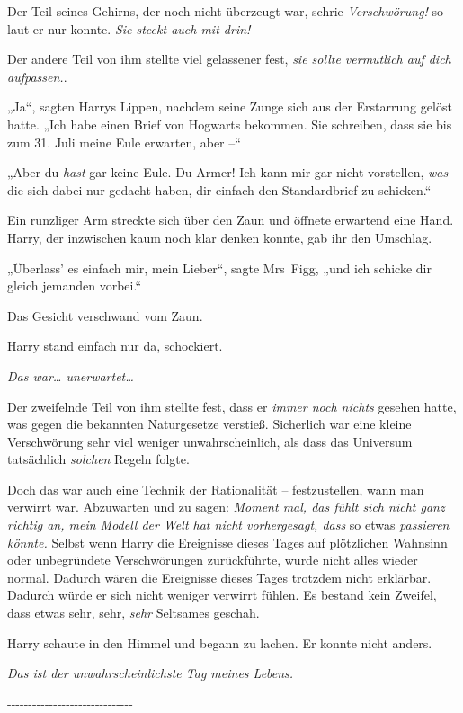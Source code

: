 {Der Teil seines Gehirns, der noch nicht überzeugt war, schrie \emph{Verschwörung!} so laut er nur konnte. \emph{Sie steckt auch mit drin!}

Der andere Teil von ihm stellte viel gelassener fest, \emph{sie sollte vermutlich auf dich aufpassen.}.

„Ja“, sagten Harrys Lippen, nachdem seine Zunge sich aus der Erstarrung gelöst hatte. „Ich habe einen Brief von Hogwarts bekommen. Sie schreiben, dass sie bis zum 31. Juli meine Eule erwarten, aber --“

„Aber du \emph{hast} gar keine Eule. Du Armer! Ich kann mir gar nicht vorstellen, \emph{was} die sich dabei nur gedacht haben, dir einfach den Standardbrief zu schicken.“

Ein runzliger Arm streckte sich über den Zaun und öffnete erwartend eine Hand. Harry, der inzwischen kaum noch klar denken konnte, gab ihr den Umschlag.

„Überlass' es einfach mir, mein Lieber“, sagte Mrs~Figg, „und ich schicke dir gleich jemanden vorbei.“

Das Gesicht verschwand vom Zaun.

Harry stand einfach nur da, schockiert.

\emph{Das war… unerwartet…}

Der zweifelnde Teil von ihm stellte fest, dass er \emph{immer noch nichts} gesehen hatte, was gegen die bekannten Naturgesetze verstieß. Sicherlich war eine kleine Verschwörung sehr viel weniger unwahrscheinlich, als dass das Universum tatsächlich \emph{solchen} Regeln folgte.

Doch das war auch eine Technik der Rationalität -- festzustellen, wann man verwirrt war. Abzuwarten und zu sagen: \emph{Moment mal, das fühlt sich nicht ganz richtig an, mein Modell der Welt hat nicht vorhergesagt, dass} so etwas \emph{passieren könnte.} Selbst wenn Harry die Ereignisse dieses Tages auf plötzlichen Wahnsinn oder unbegründete Verschwörungen zurückführte, wurde nicht alles wieder normal. Dadurch wären die Ereignisse dieses Tages trotzdem nicht erklärbar. Dadurch würde er sich nicht weniger verwirrt fühlen. Es bestand kein Zweifel, dass etwas sehr, sehr, \emph{sehr} Seltsames geschah.

Harry schaute in den Himmel und begann zu lachen. Er konnte nicht anders.

\emph{Das ist der unwahrscheinlichste Tag meines Lebens.}

-\/-\/-\/-\/-\/-\/-\/-\/-\/-\/-\/-\/-\/-\/-\/-\/-\/-\/-\/-\/-\/-\/-\/-\/-\/-\/-\/-\/-\/-

}
